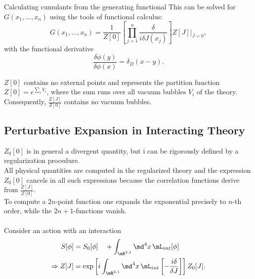 \begin{mybox}{Calculating cumulants from the generating functional}
	This can be solved for $G(x_1,\dots,x_n)$ using the tools of functional calculus:
	\begin{equation}
	G(x_1,\dots,x_n) = \frac{1}{Z[0]} \left[\prod_{j=1}^{n} \frac{\delta}{i \delta J(x_j)}\right] Z[J] |_{J=0},
	\end{equation}
	with the functional derivative
	\begin{equation}
	\frac{\delta \phi(y) }{\delta \phi(x)} = \delta_D(x-y).
	\end{equation}
\end{mybox}
$Z[0]$ contains no external points and represents the partition function $Z[0]=e^{\sum_i V_i}$, where the sum runs over all vacuum bubbles $V_i$ of the theory. Consequently, $\frac{Z[J]}{Z[0]}$ contains no vacuum bubbles.







\subsection{Perturbative Expansion in Interacting Theory}
$Z_0[0]$ is in general a divergent quantity, but i can be rigorously defined by a regularization procedure.\\
All physical quantities are computed in the regularized theory and the expression $Z_0[0]$ cancels in all such expressions because the correlation functions derive from $\frac{Z[J]}{Z[0]}$.\\
To compute a $2n$-point function one expands the exponential precisely to $n$-th order, while the $2n+1$-functions vanish.\\
\\
Consider an action with an interaction
\begin{align}
	S[\phi] &= S_0 [\phi] \quad + \int_{\mR^{3,1}} \md^4 x \, \mL_{int} [\phi] \\
	\Rightarrow Z[J] &= \exp\left[i \int_{\mR^{3,1}} \md^4 x \, \mL_{int} \left[- \frac{i \delta}{\delta J} \right]   \right] Z_0[J].
\end{align}

